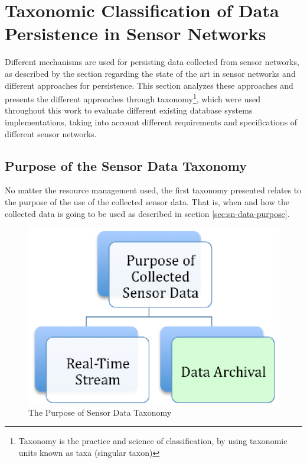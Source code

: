 

\chapter{Taxonomic Classification of Data Persistence in Sensor Networks}
\label{chap:taxonomies}

Different mechanisms are used for persisting data collected from sensor
networks, as described by the section regarding the state of the art in sensor
networks and different approaches for persistence. This section analyzes these
approaches and presents the different approaches through
taxonomy\footnote{Taxonomy is the practice and science of classification, by
using taxonomic units known as taxa (singular taxon)}, which were used
throughout this work to evaluate different existing database systems
implementations, taking into account different requirements and specifications
of different sensor networks.

\section{Purpose of the Sensor Data Taxonomy}

No matter the resource management used, the first taxonomy presented relates to
the purpose of the use of the collected sensor data. That is, when and how the
collected data is going to be used as described in section
\ref{sec:sn-data-purpose}.

\begin{figure}[h]
  \centering
  \includegraphics{../diagrams/taxonomy-data-purpose}
  \caption{The Purpose of Sensor Data Taxonomy}
  \label{fig:taxonomy-data-purpose}
\end{figure}

